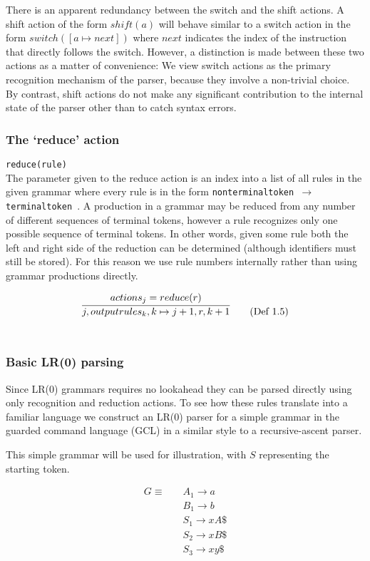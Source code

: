 \documentclass[11pt]{article}
\begin{document}
There is an apparent redundancy between the switch and the shift actions. 
A shift action of the form $shift(a)$ will behave similar to a switch action in the form $switch([a \mapsto next])$ where $next$ indicates the index of the instruction that directly follows the switch.
However, a distinction is made between these two actions as a matter of convenience: 
We view switch actions as the primary recognition mechanism of the parser, because they involve a non-trivial choice.
By contrast, shift actions do not make any significant contribution to the internal state of the parser other than to catch syntax errors.
	
\subsubsection{The `reduce' action}
\texttt{reduce(rule)}\\
The parameter given to the reduce action is an index into a list of all rules in the given grammar where every rule is in the form \texttt{nonterminaltoken $\rightarrow$ terminaltoken \textellipsis}. 
A production in a grammar may be reduced from any number of different sequences of terminal tokens, however a rule recognizes only one possible sequence of terminal tokens.
In other words, given some rule both the left and right side of the reduction can be determined (although identifiers must still be stored).
For this reason we use rule numbers internally rather than using grammar productions directly.

\begin{equation}
\infer{j, outputrules_k, k \mapsto j+1, r, k+1}{actions_j = reduce(r)} \tag{Def 1.5}
\end{equation}\\

\subsubsection{Basic LR(0) parsing}

Since LR(0) grammars requires no lookahead they can be parsed directly using only recognition and reduction actions.
To see how these rules translate into a familiar language we construct an LR(0) parser for a simple grammar in the guarded command language (GCL) in a similar style to a recursive-ascent parser.

This simple grammar will be used for illustration, with $S$ representing the starting token.

\begin{align*}
G \equiv \quad & A_1 \rightarrow a\\
               & B_1 \rightarrow b\\
               & S_1 \rightarrow x A \$\\
               & S_2 \rightarrow x B \$\\
               & S_3 \rightarrow x y \$
\end{align*}
\end{document}
